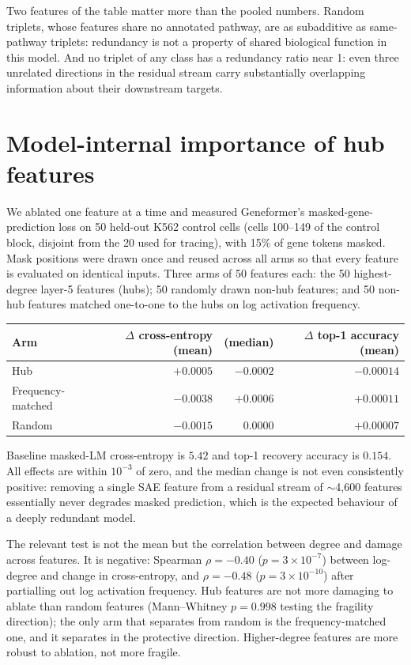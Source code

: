 \documentclass[10pt,letterpaper]{article}
\begin{document}
Two features of the table matter more than the pooled numbers. Random triplets, whose features share no annotated pathway, are as subadditive as same-pathway triplets: redundancy is not a property of shared biological function in this model. And no triplet of any class has a redundancy ratio near 1: even three unrelated directions in the residual stream carry substantially overlapping information about their downstream targets.


\section{Model-internal importance of hub features}
\label{supp:hub_importance}

We ablated one feature at a time and measured Geneformer's masked-gene-prediction loss on 50 held-out K562 control cells (cells 100--149 of the control block, disjoint from the 20 used for tracing), with 15\% of gene tokens masked. Mask positions were drawn once and reused across all arms so that every feature is evaluated on identical inputs. Three arms of 50 features each: the 50 highest-degree layer-5 features (hubs); 50 randomly drawn non-hub features; and 50 non-hub features matched one-to-one to the hubs on log activation frequency.

\begin{center}
\begin{tabular}{lrrr}
\toprule
Arm & $\Delta$ cross-entropy (mean) & (median) & $\Delta$ top-1 accuracy (mean) \\
\midrule
Hub              & $+0.0005$ & $-0.0002$ & $-0.00014$ \\
Frequency-matched & $-0.0038$ & $+0.0006$ & $+0.00011$ \\
Random           & $-0.0015$ & $\phantom{+}0.0000$ & $+0.00007$ \\
\bottomrule
\end{tabular}
\end{center}

Baseline masked-LM cross-entropy is $5.42$ and top-1 recovery accuracy is $0.154$. All effects are within $10^{-3}$ of zero, and the median change is not even consistently positive: removing a single SAE feature from a residual stream of $\sim$4{,}600 features essentially never degrades masked prediction, which is the expected behaviour of a deeply redundant model.

The relevant test is not the mean but the correlation between degree and damage across features. It is negative: Spearman $\rho=-0.40$ ($p=3\times10^{-7}$) between log-degree and change in cross-entropy, and $\rho=-0.48$ ($p=3\times10^{-10}$) after partialling out log activation frequency. Hub features are not more damaging to ablate than random features (Mann--Whitney $p=0.998$ testing the fragility direction); the only arm that separates from random is the frequency-matched one, and it separates in the protective direction. Higher-degree features are more robust to ablation, not more fragile.
\end{document}
